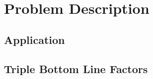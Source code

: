 \documentclass[../mthe-493-project-proposal.tex]{subfiles}
\begin{document}
    \chapter{Problem Description}
    \label{ch:problem-description}
    \blindtext

    \section{Application}
    \Blindtext

    \section{Triple Bottom Line Factors}
    \blindtext
\end{document}

